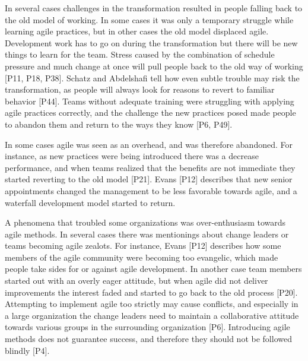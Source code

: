 \documentclass[preprint,authoryear,12pt]{elsarticle}
\begin{document}

In several cases challenges in the transformation resulted in people falling
back to the old model of working. In some cases it was only a temporary struggle
while learning agile practices, but in other cases the old model displaced
agile.
Development work has to go on during the transformation but there will be new
things to learn for the team. Stress caused by the combination of schedule
pressure and much change at once will pull people back to the old way of working
[P11, P18, P38].
Schatz and Abdelshafi tell how even subtle trouble may risk the transformation,
as people will always look for reasons to revert to familiar behavior [P44].
Teams without adequate training were struggling with applying agile practices
correctly, and the challenge the new practices posed made people to abandon them
and return to the ways they know [P6, P49].

In some cases agile was seen as an overhead, and was therefore abandoned. For
instance, as new practices were being introduced there was a decrease
performance, and when teams realized that the benefits are not immediate they
started reverting to the old model [P21].
Evans [P12] describes that new senior appointments changed the management to be
less favorable towards agile, and a waterfall development model started to
return.


A phenomena that troubled some organizations was over-enthusiasm towards agile
methods. In several cases there was mentionings about change leaders or teams
becoming agile zealots. For instance, Evans [P12] describes how some members of
the agile community were becoming too evangelic, which made people take sides
for or against agile development. In another case team members started out with
an overly eager attitude, but when agile did not deliver improvements the
interest faded and started to go back to the old process [P20]. Attempting to
implement agile too strictly may cause conflicts, and especially in a large
organization the change leaders need to maintain a collaborative attitude
towards various groups in the surrounding organization [P6]. Introducing agile
methods does not guarantee success, and therefore they should not be followed
blindly [P4].


\end{document}
